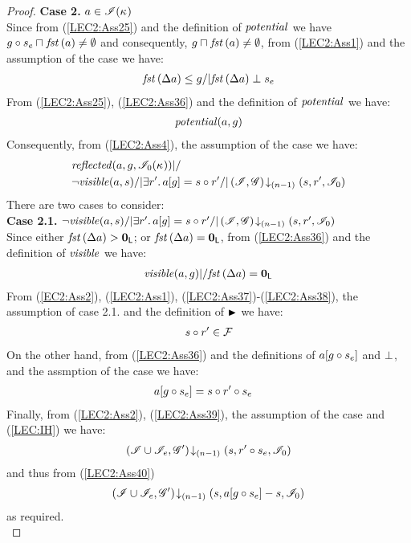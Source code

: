 \begin{lemma}
\begin{proof}
\noindent\textbf{Case 2. }$a \in \mathscr{I}(\kappa_{})$\\
Since from (\ref{LEC2:Ass25}) and the definition of $\mathit{potential}$ we have $g \circ s_e \sqcap_{} \mathit{fst}\left(a\right) \not= \emptyset$ and consequently, $g \sqcap_{} \mathit{fst}\left(a\right) \not= \emptyset$, from (\ref{LEC2:Ass1}) and the assumption of the case we have:
%
\begin{align}
	\mathit{fst}\left(\Delta {a}\right) \leq g /| \mathit{fst}\left(\Delta {a}\right) \mathrel{\bot} s_e \label{LEC2:Ass36}
\end{align}
% 
From (\ref{LEC2:Ass25}), (\ref{LEC2:Ass36}) and the definition of $\mathit{potential}$ we have:
%
\begin{align}
	\mathit{potential}(a, g) \label{LEC2:Ass37}
\end{align}
Consequently, from (\ref{LEC2:Ass4}), the assumption of the case we have:
%
\begin{align*}
	&\mathit{reflected}(a, g, \mathscr{I}_0(\kappa_{})) |/ \\
	&\neg\mathit{visible}(a, s) /| \exists r'.\, a[g] = s \circ r' /| \left(\mathscr{I}, \mathscr{G}\right) \!\downarrow_{(n-1)} \left(s, r', \mathscr{I}_0\right)
\end{align*}
%
There are two cases to consider:\\

\noindent\textbf{Case 2.1.} 
%
$
	\neg\mathit{visible}(a, s) /| \exists r'.\, a[g] = s \circ r' /| \left(\mathscr{I}, \mathscr{G}\right) \!\downarrow_{(n-1)} \left(s, r', \mathscr{I}_0\right)
$\\
%
Since either $\mathit{fst}\left(\Delta {a}\right) > \mathbf{0}_{\textsf{L}}$; or $\mathit{fst}\left(\Delta {a}\right) = \mathbf{0}_{\textsf{L}}$, from (\ref{LEC2:Ass36}) and the definition of $\mathit{visible}$ we have:
%
\begin{align}
	\mathit{visible}(a, g) |/ \mathit{fst}\left(\Delta {a}\right) = \mathbf{0}_{\textsf{L}} \label{LEC2:Ass38}
\end{align}
%
From (\ref{EC2:Ass2}), (\ref{LEC2:Ass1}), (\ref{LEC2:Ass37})-(\ref{LEC2:Ass38}), the assumption of case 2.1. and the definition of $\strictfences$ we have:
%
\begin{align}
	s \circ r' \in \mathcal{F}_{}  \label{LEC2:Ass39}
\end{align}
%
On the other hand, from (\ref{LEC2:Ass36}) and the definitions of $a[g \circ s_e]$ and $\mathrel{\bot}$, and the assmption of the case we have: 
%
\begin{align}
	& a[g \circ s_e] = s \circ r' \circ s_e \label{LEC2:Ass40}
\end{align}
%
Finally, from (\ref{LEC2:Ass2}), (\ref{LEC2:Ass39}), the assumption of the case and (\ref{LEC:IH}) we have:
%
\begin{align*}
	\left(\mathscr{I} \cup \mathscr{I}_{e}, \mathscr{G}'\right) \!\downarrow_{(n-1)} \left(s, r' \circ s_e, \mathscr{I}_0\right)
\end{align*}
%
and thus from (\ref{LEC2:Ass40}) 
%
\begin{align*}
	\left(\mathscr{I} \cup \mathscr{I}_{e}, \mathscr{G}'\right) \!\downarrow_{(n-1)} \left(s, a[g \circ s_e] - s, \mathscr{I}_0\right)
\end{align*}
%
as required.\\


\end{proof}
\end{lemma}
